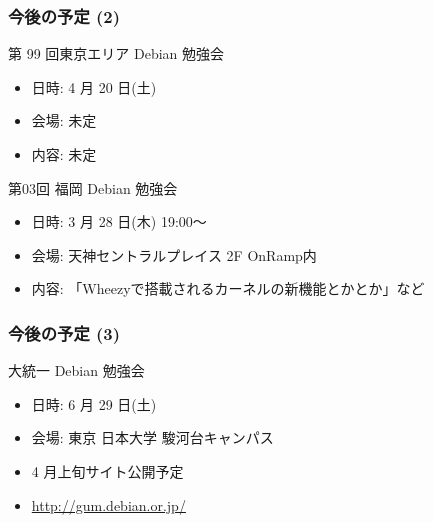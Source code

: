 \documentclass[cjk,dvipdfmx,10pt,compress,%
hyperref={bookmarks=true,bookmarksnumbered=true,bookmarksopen=false,%
colorlinks=false,%
pdftitle={第 70 回 関西 Debian 勉強会},%
pdfauthor={倉敷・のがた・佐々木・かわだ・八津尾},%
pdfsubject={資料},%
}]{beamer}
\begin{document}
\begin{frame}[fragile]
\frametitle{今後の予定 (2)}

\begin{block}{第 99 回東京エリア Debian 勉強会}
  \begin{itemize}
  \item 日時: 4 月 20 日(土)
  \item 会場: 未定
  \item 内容: 未定
  \end{itemize}
\end{block}

\begin{block}{第03回 福岡 Debian 勉強会}
  \begin{itemize}
  \item 日時: 3 月 28 日(木) 19:00〜
  \item 会場: 天神セントラルプレイス 2F OnRamp内
  \item 内容: 「Wheezyで搭載されるカーネルの新機能とかとか」など
  \end{itemize}
\end{block}

\end{frame}

\begin{frame}[fragile]
\frametitle{今後の予定 (3)}

\begin{block}{大統一 Debian 勉強会}
  \begin{itemize}
  \item 日時: 6 月 29 日(土)
  \item 会場: 東京 日本大学 駿河台キャンパス
  \item 4 月上旬サイト公開予定
  \item \url{http://gum.debian.or.jp/}
  \end{itemize}
\end{block}

\end{frame}


\takahashi[50]{  }
\end{document}
